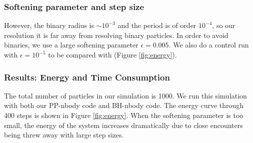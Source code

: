 \subsubsection*{Softening parameter and step size}
However, the binary radius is $ \sim 10^{-3} $ and the period is of order $ 10^{-4} $, so our 
resolution it is far away from resolving binary particles. In order to avoid binaries, we use 
a large softening parameter $ \epsilon = 0.005 $. We also do a control run with $ \epsilon 
= 10^{-5} $ to be compared with (Figure \ref{fig:energy}).

\subsubsection*{Results: Energy and Time Consumption}
The total number of particles in our simulation is 1000. We run this simulation with both 
our PP-nbody code and BH-nbody code. The energy curve through 400 steps is shown in 
Figure \ref{fig:energy}. When the softening parameter is too small, the energy of the 
system increases dramatically due to close encounters being threw away with large step 
sizes. 

